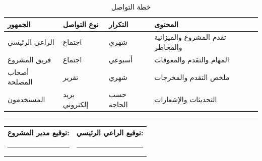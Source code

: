 \documentclass[11pt,a4paper]{article}
\begin{document}
\begin{table}[H]
\centering
\caption{خطة التواصل}
\renewcommand{\arraystretch}{1.3}
\begin{tabularx}{\textwidth}{L{3.5cm} L{3cm} C{2.5cm} X}
\toprule
\textbf{الجمهور} & \textbf{نوع التواصل} & \textbf{التكرار} & \textbf{المحتوى} \\
\midrule
الراعي الرئيسي & اجتماع & شهري & تقدم المشروع والميزانية والمخاطر \\
فريق المشروع & اجتماع & أسبوعي & المهام والتقدم والمعوقات \\
أصحاب المصلحة & تقرير & شهري & ملخص التقدم والمخرجات \\
المستخدمون & بريد إلكتروني & حسب الحاجة & التحديثات والإشعارات \\
\bottomrule
\end{tabularx}
\end{table}

\vspace{2em}

\noindent\rule{\textwidth}{0.4pt}

\vspace{0.5em}

\noindent
\begin{tabularx}{\textwidth}{X X}
\textbf{توقيع مدير المشروع:} & \textbf{توقيع الراعي الرئيسي:} \\[2em]
\rule{6cm}{0.3pt} & \rule{6cm}{0.3pt} \\
\end{tabularx}
\end{document}
